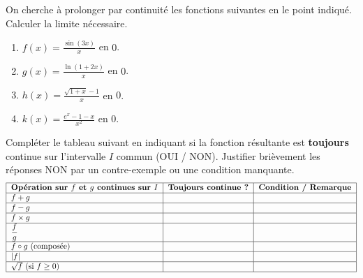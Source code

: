 \documentclass[11pt]{article}
\begin{document}
\begin{exercice}
On cherche à prolonger par continuité les fonctions suivantes en le point indiqué. Calculer la limite nécessaire.
\begin{enumerate}
    \item $f(x) = \frac{\sin(3x)}{x}$ en $0$.
    \item $g(x) = \frac{\ln(1+2x)}{x}$ en $0$.
    \item $h(x) = \frac{\sqrt{1+x}-1}{x}$ en $0$.
    \item $k(x) = \frac{e^{x}-1-x}{x^2}$ en $0$.
\end{enumerate}
\end{exercice}

\begin{exercice}
Compléter le tableau suivant en indiquant si la fonction résultante est \textbf{toujours} continue sur l'intervalle $I$ commun (OUI / NON). Justifier brièvement les réponses NON par un contre-exemple ou une condition manquante.
\[
\begin{tabular}{|l|c|c|}
\hline
\textbf{Opération sur $f$ et $g$ continues sur $I$} & \textbf{Toujours continue ?} & \textbf{Condition / Remarque} \\
\hline
$f + g$ & & \\
\hline
$f - g$ & & \\
\hline
$f \times g$ & & \\
\hline
$\dfrac{f}{g}$ & & \\
\hline
$f \circ g$ (composée) & & \\
\hline
$|f|$ & & \\
\hline
$\sqrt{f}$ (si $f \geq 0$) & & \\
\hline
\end{tabular}
\]
\end{exercice}
\end{document}

